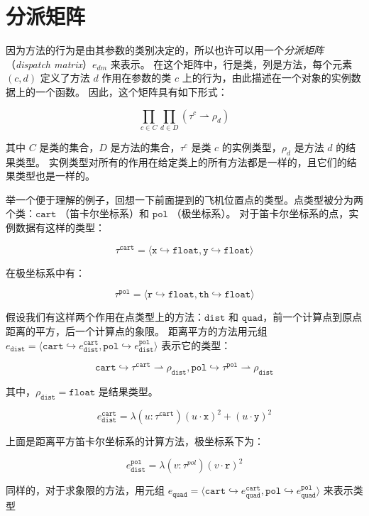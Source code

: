 \section{分派矩阵}
因为方法的行为是由其参数的类别决定的，所以也许可以用一个\textit{分派矩阵}（\textit{dispatch matrix}）$ e_{dm} $ 来表示。
在这个矩阵中，行是类，列是方法，每个元素 $ (c, d) $ 定义了方法 $d$ 作用在参数的类 $c$ 上的行为，由此描述在一个对象的实例数据上的一个函数。
因此，这个矩阵具有如下形式：

$$ \prod_{c \in C} \prod_{d \in D} (\tau^{c} \rightharpoonup \rho_{d}) $$

其中 $C$ 是类的集合，$D$ 是方法的集合，$\tau^c$ 是类 $c$ 的实例类型，$ \rho_{d} $ 是方法 $d$ 的结果类型。
实例类型对所有的作用在给定类上的所有方法都是一样的，且它们的结果类型也是一样的。

举一个便于理解的例子，回想一下前面提到的飞机位置点的类型。点类型被分为两个类：$ \mathtt{cart} $ （笛卡尔坐标系）和 $ \mathtt{pol} $ （极坐标系）。
对于笛卡尔坐标系的点，实例数据有这样的类型：

$$ \tau^{\mathtt{cart}} =  \langle \mathtt{x} \hookrightarrow \mathtt{float}, \mathtt{y} \hookrightarrow \mathtt{float} \rangle $$

在极坐标系中有：

$$ \tau^{\mathtt{pol}} =  \langle \mathtt{r} \hookrightarrow \mathtt{float}, \mathtt{th} \hookrightarrow \mathtt{float} \rangle $$

假设我们有这样两个作用在点类型上的方法：$ \mathtt{dist} $ 和 $ \mathtt{quad} $，前一个计算点到原点距离的平方，后一个计算点的象限。
距离平方的方法用元组 $ e_{\mathtt{dist}} = \langle \mathtt{cart} \hookrightarrow e^{\mathtt{cart}}_{\mathtt{dist}}, \mathtt{pol} \hookrightarrow e^{\mathtt{pol}}_{\mathtt{dist}} \rangle $ 表示它的类型：

$$ \mathtt{cart} \hookrightarrow \tau^{\mathtt{cart}} \rightharpoonup \rho_{\mathtt{dist}}, \mathtt{pol} \hookrightarrow \tau^{\mathtt{pol}} \rightharpoonup \rho_{\mathtt{dist}} $$

其中，$ \rho_{\mathtt{dist}} = \mathtt{float} $ 是结果类型。

$$ e^{\mathtt{cart}}_{\mathtt{dist}} = \lambda (u : \tau^{\mathtt{cart}})(u \cdot \mathtt{x})^2 + (u \cdot \mathtt{y})^2 $$

上面是距离平方笛卡尔坐标系的计算方法，极坐标系下为：

$$ e^{\mathtt{pol}}_{\mathtt{dist}} = \lambda (v : \tau^{pol})(v \cdot \mathtt{r})^2 $$

同样的，对于求象限的方法，用元组 $ e_{\mathtt{quad}} = \langle \mathtt{cart} \hookrightarrow e^{\mathtt{cart}}_{\mathtt{quad}}, \mathtt{pol} \hookrightarrow e^{\mathtt{pol}}_{\mathtt{quad}} \rangle$ 来表示类型

